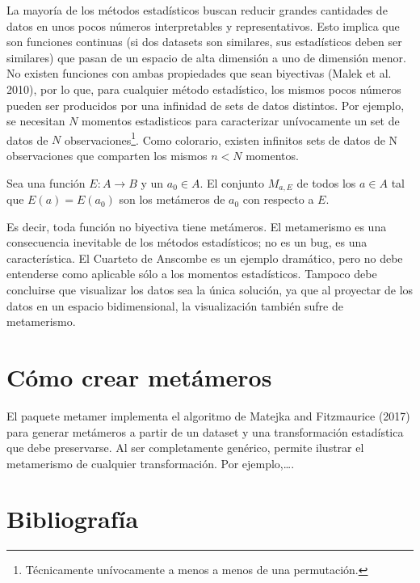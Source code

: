 \documentclass[runningheads,español]{llncs}
\begin{document}
La mayoría de los métodos estadísticos buscan reducir grandes cantidades
de datos en unos pocos números interpretables y representativos. Esto
implica que son funciones continuas (si dos datasets son similares, sus
estadísticos deben ser similares) que pasan de un espacio de alta
dimensión a uno de dimensión menor. No existen funciones con ambas
propiedades que sean biyectivas (Malek et al. 2010), por lo que, para
cualquier método estadístico, los mismos pocos números pueden ser
producidos por una infinidad de sets de datos distintos. Por ejemplo, se
necesitan \(N\) momentos estadisticos para caracterizar unívocamente un
set de datos de \(N\)
observaciones\footnote{Técnicamente unívocamente a menos a menos de una permutación.}.
Como colorario, existen infinitos sets de datos de N observaciones que
comparten los mismos \(n < N\) momentos.

\begin{definition}
Sea una función $E : A \rightarrow B$ y un $a_0 \in A$. El conjunto $M_{a, E}$ de todos los $a \in A$ tal que $E(a) = E(a_0)$ son los metámeros de $a_0$ con respecto a $E$. 
\end{definition}

Es decir, toda función no biyectiva tiene metámeros. El metamerismo es
una consecuencia inevitable de los métodos estadísticos; no es un bug,
es una característica. El Cuarteto de Anscombe es un ejemplo dramático,
pero no debe entenderse como aplicable sólo a los momentos estadísticos.
Tampoco debe concluirse que visualizar los datos sea la única solución,
ya que al proyectar de los datos en un espacio bidimensional, la
visualización también sufre de metamerismo.

\hypertarget{como-crear-metameros}{%
\section{Cómo crear metámeros}\label{como-crear-metameros}}

El paquete metamer implementa el algoritmo de Matejka and Fitzmaurice
(2017) para generar metámeros a partir de un dataset y una
transformación estadística que debe preservarse. Al ser completamente
genérico, permite ilustrar el metamerismo de cualquier transformación.
Por ejemplo,\ldots.

\hypertarget{bibliografia}{%
\section*{Bibliografía}\label{bibliografia}}
\end{document}
